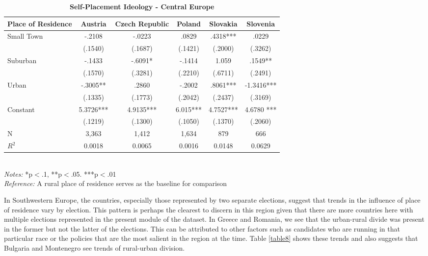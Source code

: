 \documentclass[12pt, titlepage]{article}
\newcommand\e{\emph}
\newcommand\tb{\textbf}
\begin{document}
\begin{singlespace}
	\begin{table}[H]
		\centering
		\caption{\tb{Self-Placement Ideology - Central Europe}}
		\begin{tabulary}{\linewidth}{l c c c c c}
			\\
			\hline
			\tb{Place of Residence} &\tb{Austria}&\tb{Czech Republic}& \tb{Poland} &\tb{Slovakia}&\tb{Slovenia} \\
			\hline
			Small Town&-.2108& -.0223 & .0829 & .4318*** & .0229 \\
			&(.1540) & (.1687) & (.1421) & (.2000) & (.3262)\\
			Suburban&-.1433& -.6091*& -.1414 & 1.059& .1549** \\
			&(.1570)&(.3281) & (.2210) & (.6711) & (.2491)\\
			Urban&-.3005**&.2860 & -.2002 & .8061*** & -1.3416***\\
			&(.1335) &(.1773) & (.2042) & (.2437) & (.3169)\\
			Constant& 5.3726***& 4.9135***& 6.015*** & 4.7527***  & 4.6780 ***\\
			&(.1219) & (.1300) & (.1050) & (.1370) & (.2060)\\
			N&3,363& 1,412& 1,634 & 879& 666 \\
			$R^2$&0.0018&0.0065 & 0.0016 & 0.0148 & 0.0629\\
			\hline
		\end{tabulary}
		\\
		\e{Notes:} *p$<$.1, **p$<$.05. ***p$<$.01 \\
		\e{Reference:} A rural place of residence serves as the baseline for comparison
		\label{table7}
	\end{table}
\end{singlespace}

In Southwestern Europe, the countries, especially those represented by two separate elections, suggest that trends in the influence of place of residence vary by election. This pattern is perhaps the clearest to discern in this region given that there are more countries here with multiple elections represented in the present module of the dataset. In Greece and Romania, we see that the urban-rural divide was present in the former but not the latter of the elections. This can be attributed to other factors such as candidates who are running in that particular race or the policies that are the most salient in the region at the time. Table \ref{table8} shows these trends and also suggests that Bulgaria and Montenegro see trends of rural-urban division.
\end{document}
